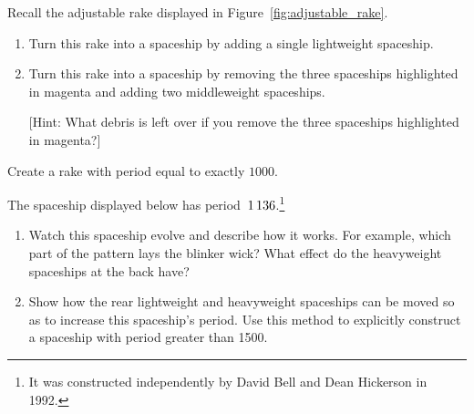 \begin{multicols}{2}
	
	\mfilbreak
	
	
	\begin{problem}\label{exer:adjustable_spaceship} 
		Recall the adjustable rake displayed in Figure~\ref{fig:adjustable_rake}.\smallskip
		
		\begin{enumerate}[label=\bf\color{ocre}(\alph*)]
			\item Turn this rake into a spaceship by adding a single lightweight spaceship.
			
			\item Turn this rake into a spaceship by removing the three spaceships highlighted in magenta and adding two middleweight spaceships.
			
			[Hint: What debris is left over if you remove the three spaceships highlighted in magenta?]
		\end{enumerate}
	\end{problem}
	
	
	\mfilbreak
	
	
	\begin{problem}\label{exer:high_period_wick} 
		Create a rake with period equal to exactly $1000$.
	\end{problem}
	
	
	\mfilbreak
	
	
	\begin{problem}\label{exer:blinker_ship}
		The spaceship displayed below has period~$1{\,}136$.\footnote{It was constructed independently by David Bell and Dean Hickerson in 1992.}
		
		\begin{center}
		\end{center}
		
		\begin{enumerate}[label=\bf\color{ocre}(\alph*)]
			\item {} Watch this spaceship evolve and describe how it works. For example, which part of the pattern lays the blinker wick? What effect do the heavyweight spaceships at the back have?
			
			\item {} Show how the rear lightweight and heavyweight spaceships can be moved so as to increase this spaceship's period. Use this method to explicitly construct a spaceship with period greater than 1500.
		\end{enumerate}
	\end{problem}
	

\end{multicols}
